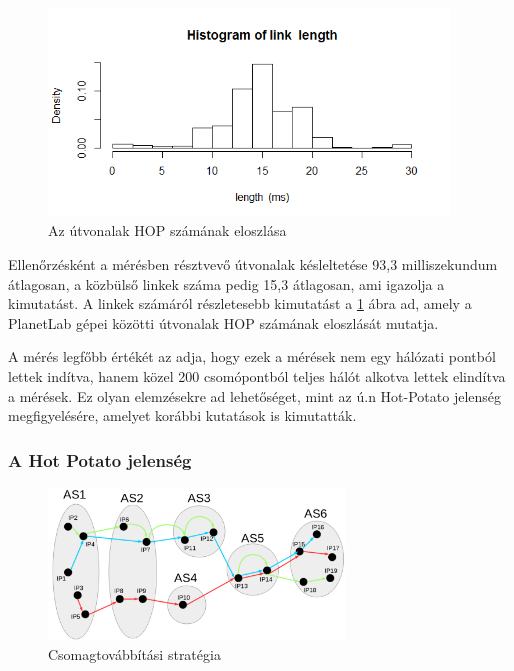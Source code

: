 \pagebreak

\begin{figure}[h!]
	\centering
	\includegraphics[width=0.95\textwidth, keepaspectratio]{figures/link-length-hist.png}
	\caption{Az útvonalak HOP számának eloszlása}
	\label{fig:link-len}
\end{figure}

Ellenőrzésként a mérésben résztvevő útvonalak késleltetése 93,3 milliszekundum átlagosan, a közbülső linkek száma pedig 15,3 átlagosan, ami igazolja a kimutatást. A linkek számáról részletesebb kimutatást a \ref{fig:link-len} ábra ad, amely a PlanetLab gépei közötti útvonalak HOP számának eloszlását mutatja.

A mérés legfőbb értékét az adja, hogy ezek a mérések nem egy hálózati pontból lettek indítva, hanem közel 200 csomópontból teljes hálót alkotva lettek elindítva a mérések. Ez olyan elemzésekre ad lehetőséget, mint az ú.n Hot-Potato jelenség megfigyelésére, amelyet korábbi kutatások is kimutatták\cite{hot-potato}.

\subsubsection*{A Hot Potato jelenség}

\begin{figure}[!ht]
	\centering
	\includegraphics[width=0.7\textwidth, keepaspectratio]{figures/hot-potato.PNG}
	\caption{Csomagtovábbítási stratégia}
	\label{fig:hot-potato}
\end{figure}

